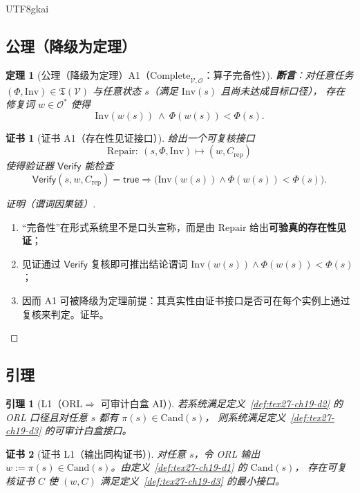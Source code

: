 \documentclass[12pt]{article}
\newtheorem{theorem}{定理}[section]
\newtheorem{lemma}{引理}[section]
\newtheorem{Certificate}{证书}[section]
\begin{document}
\begin{CJK*}{UTF8}{gkai}
\subsection{公理（降级为定理）}
\label{subsec:tex27-ch19-axiom-as-theorem}

\begin{theorem}[公理（降级为定理）A1（$\mathrm{Complete}_{\mathcal{V},\mathcal{O}}$：算子完备性）]
\label{thm:tex27-ch19-a1}
\textbf{断言}：对任意任务 $(\Phi,\mathrm{Inv})\in\mathfrak{T}(\mathcal{V})$ 与任意状态 $s$（满足 $\mathrm{Inv}(s)$ 且尚未达成目标口径），
存在修复词 $w\in\mathcal{O}^{*}$ 使得
\[
  \mathrm{Inv}(w(s))\ \wedge\ \Phi(w(s))<\Phi(s).
\]
\end{theorem}

\begin{Certificate}[证书 A1（存在性见证接口）]
\label{cert:tex27-ch19-a1}
给出一个可复核接口
\[
  \mathrm{Repair}:\ (s,\Phi,\mathrm{Inv})\mapsto (w,C_{\mathrm{rep}})
\]
使得验证器 $\mathsf{Verify}$ 能检查
\[
  \mathsf{Verify}(s,w,C_{\mathrm{rep}})=\textsf{true}
  \Rightarrow
  \bigl(\mathrm{Inv}(w(s))\wedge \Phi(w(s))<\Phi(s)\bigr).
\]
\end{Certificate}

\begin{proof}[证明（谓词因果链）]
\begin{enumerate}
  \item “完备性”在形式系统里不是口头宣称，而是由 $\mathrm{Repair}$ 给出\textbf{可验真的存在性见证}；
  \item 见证通过 $\mathsf{Verify}$ 复核即可推出结论谓词 $\mathrm{Inv}(w(s))\wedge \Phi(w(s))<\Phi(s)$；
  \item 因而 A1 可被降级为定理前提：其真实性由证书接口是否可在每个实例上通过复核来判定。证毕。
\end{enumerate}
\end{proof}

\subsection{引理}
\label{subsec:tex27-ch19-lemmas}

\begin{lemma}[L1（$\mathrm{ORL}\Rightarrow$ 可审计白盒 AI）]
\label{lem:tex27-ch19-l1}
若系统满足定义~\ref{def:tex27-ch19-d2} 的 ORL 口径且对任意 $s$ 都有 $\pi(s)\in\mathrm{Cand}(s)$，
则系统满足定义~\ref{def:tex27-ch19-d3} 的可审计白盒接口。
\end{lemma}

\begin{Certificate}[证书 L1（输出同构证书）]
\label{cert:tex27-ch19-l1}
对任意 $s$，令 ORL 输出 $w:=\pi(s)\in\mathrm{Cand}(s)$。由定义~\ref{def:tex27-ch19-d1} 的 $\mathrm{Cand}(s)$，
存在可复核证书 $C$ 使 $(w,C)$ 满足定义~\ref{def:tex27-ch19-d3} 的最小接口。
\end{Certificate}


\end{CJK*}
\end{document}
